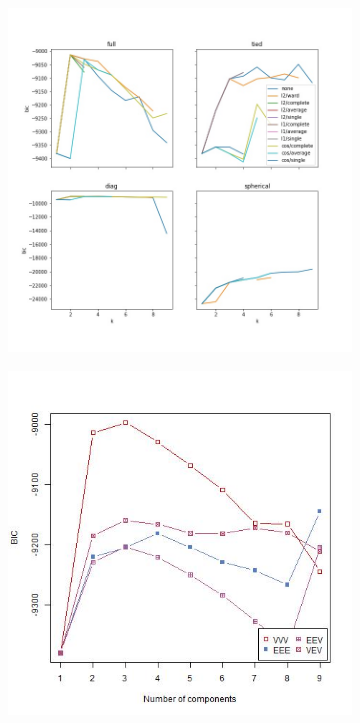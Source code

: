 \documentclass{article}
\begin{document}
\begin{figure}[h!]
\centering
\begin{subfigure}[b]{0.35\linewidth}
  \includegraphics[width=\linewidth]{bc_python_bicplot.jpg}
\caption{}
\end{subfigure}
\begin{subfigure}[b]{0.35\linewidth}
  \includegraphics[width=\linewidth]{bc_r_bicplot.jpg}

\end{subfigure}
\end{figure}
\end{document}
